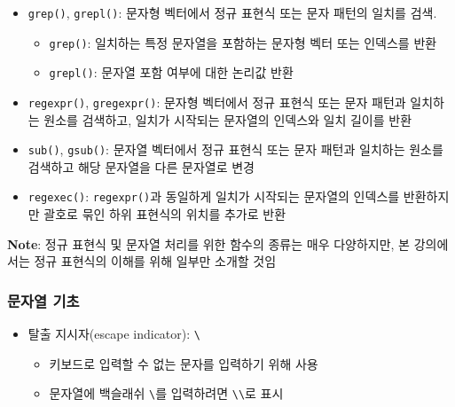 \documentclass[
  11pt,
]{krantz}
\makeatletter
\providecommand{\tightlist}{%
  \setlength{\itemsep}{0pt}\setlength{\parskip}{0pt}}
\newenvironment{kframe}{%
\medskip{}
\setlength{\fboxsep}{.8em}
 \def\at@end@of@kframe{}%
 \ifinner\ifhmode%
  \def\at@end@of@kframe{\end{minipage}}%
  \begin{minipage}{\columnwidth}%
 \fi\fi%
 \def\FrameCommand##1{\hskip\@totalleftmargin \hskip-\fboxsep
 \colorbox{shadecolor}{##1}\hskip-\fboxsep
     \hskip-\linewidth \hskip-\@totalleftmargin \hskip\columnwidth}%
 \MakeFramed {\advance\hsize-\width
   \@totalleftmargin\z@ \linewidth\hsize
   \@setminipage}}%
 {\par\unskip\endMakeFramed%
 \at@end@of@kframe}
\renewenvironment{quote}{\begin{kframe}}{\end{kframe}}
\makeatother
\begin{document}
\begin{itemize}
\item
  \texttt{grep()}, \texttt{grepl()}: 문자형 벡터에서 정규 표현식 또는 문자 패턴의 일치를 검색.

  \begin{itemize}
  \tightlist
  \item
    \texttt{grep()}: 일치하는 특정 문자열을 포함하는 문자형 벡터 또는 인덱스를 반환
  \item
    \texttt{grepl()}: 문자열 포함 여부에 대한 논리값 반환
  \end{itemize}
\item
  \texttt{regexpr()}, \texttt{gregexpr()}: 문자형 벡터에서 정규 표현식 또는 문자 패턴과 일치하는 원소를 검색하고, 일치가 시작되는 문자열의 인덱스와 일치 길이를 반환
\item
  \texttt{sub()}, \texttt{gsub()}: 문자열 벡터에서 정규 표현식 또는 문자 패턴과 일치하는 원소를 검색하고 해당 문자열을 다른 문자열로 변경
\item
  \texttt{regexec()}: \texttt{regexpr()}과 동일하게 일치가 시작되는 문자열의 인덱스를 반환하지만 괄호로 묶인 하위 표현식의 위치를 추가로 반환
\end{itemize}

\begin{quote}
\textbf{Note}: 정규 표현식 및 문자열 처리를 위한 함수의 종류는 매우 다양하지만, 본 강의에서는 정규 표현식의 이해를 위해 일부만 소개할 것임
\end{quote}

\hypertarget{string-basic}{%
\subsubsection*{\texorpdfstring{\textbf{문자열 기초}}{문자열 기초}}\label{string-basic}}


\begin{itemize}
\tightlist
\item
  탈출 지시자(escape indicator): \texttt{\textbackslash{}}

  \begin{itemize}
  \tightlist
  \item
    키보드로 입력할 수 없는 문자를 입력하기 위해 사용
  \item
    문자열에 백슬래쉬 \texttt{\textbackslash{}}를 입력하려면 \texttt{\textbackslash{}\textbackslash{}}로 표시
  \end{itemize}
\end{itemize}

\footnotesize
\end{document}
